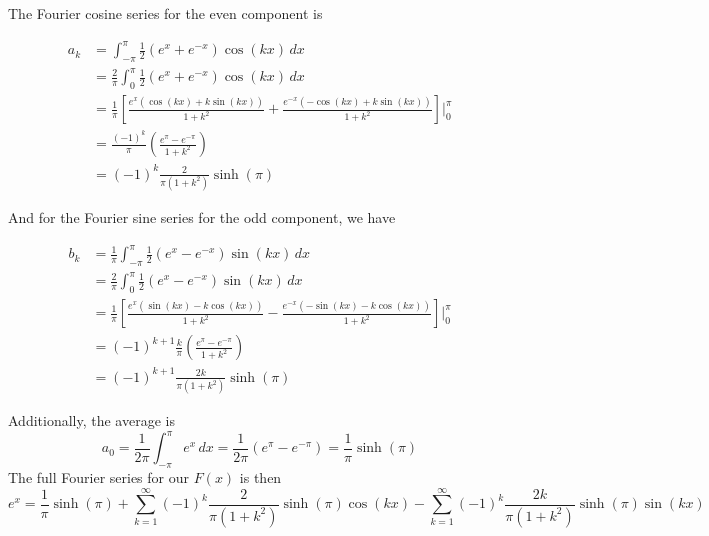 \documentclass[a4paper]{article}
\begin{document}
The Fourier cosine series for the even component is

\begin{align*}
	a_{k} & = \int^{\pi}_{-\pi} \frac{1}{2} \!\left( e^{x} + e^{-x} \right) \cos\!\left(kx\right) \, dx \\
	 & = \frac{2}{\pi} \int^{\pi}_{0} \frac{1}{2} \!\left( e^{x} + e^{-x} \right) \cos\!\left(kx\right) \, dx \\ 
	 & = \frac{1}{\pi} \!\left[ \frac{e^{x} \!\left( \cos\!\left(kx\right) + k \sin\!\left(kx\right)  \right)}{1 + k^{2}} + \frac{e^{-x} \!\left( -\cos\!\left(kx\right) + k \sin\!\left(kx\right)  \right)}{1 + k^{2}} \right] \Big|^{\pi}_{0} \\
	 & = \frac{\!\left( -1 \right)^{k}}{\pi} \!\left( \frac{e^{\pi} - e^{-\pi}}{1 + k^{2}} \right) \\
	 & = \!\left( -1 \right)^{k} \frac{2}{\pi \!\left( 1 + k^{2} \right)} \sinh\!\left( \pi \right)
\end{align*}

And for the Fourier sine series for the odd component, we have

\begin{align*}
	b_{k} & = \frac{1}{\pi} \int^{\pi}_{-\pi} \frac{1}{2} \!\left( e^{x} - e^{-x} \right) \sin\!\left(kx\right) \, dx \\
	 & = \frac{2}{\pi} \int^{\pi}_{0} \frac{1}{2} \!\left( e^{x} - e^{-x} \right) \sin\!\left(kx\right) \, dx \\ 
	 & = \frac{1}{\pi} \!\left[ \frac{e^{x} \!\left( \sin\!\left(kx\right) - k \cos\!\left(kx\right) \right)}{1 + k^{2}} - \frac{e^{-x} \!\left( -\sin\!\left(kx\right) - k \cos\!\left(kx\right) \right)}{1 + k^{2}} \right] \Big|^{\pi}_{0} \\
	 & = \!\left( -1 \right)^{k + 1} \frac{k}{\pi} \!\left( \frac{e^{\pi} - e^{-\pi}}{1 + k^{2}} \right) \\
	 & = \!\left( -1 \right)^{k + 1} \frac{2k}{\pi \!\left( 1 + k^{2} \right)} \sinh\!\left(\pi\right) 
\end{align*}

Additionally, the average is
\[
	a_{0} = \frac{1}{2 \pi} \int^{\pi}_{-\pi} e^{x} \, dx = \frac{1}{2 \pi} \!\left( e^{\pi} - e^{-\pi} \right) = \frac{1}{\pi} \sinh\!\left(\pi\right)   
\]
The full Fourier series for our \( F \!\left( x \right) \) is then
\[
	e^{x} = \frac{1}{\pi} \sinh\!\left(\pi\right) + \sum_{k = 1}^{\infty} \!\left( -1 \right)^{k} \frac{2}{\pi \!\left( 1 + k^{2} \right)} \sinh\!\left(\pi\right) \cos\!\left(kx\right) - \sum_{k = 1}^{\infty} \!\left( -1 \right)^{k} \frac{2k}{\pi \!\left( 1 + k^{2} \right)} \sinh\!\left(\pi\right) \sin\!\left(kx\right)  
\]
\end{document}
